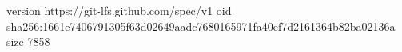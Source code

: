 version https://git-lfs.github.com/spec/v1
oid sha256:1661e7406791305f63d02649aadc7680165971fa40ef7d2161364b82ba02136a
size 7858
